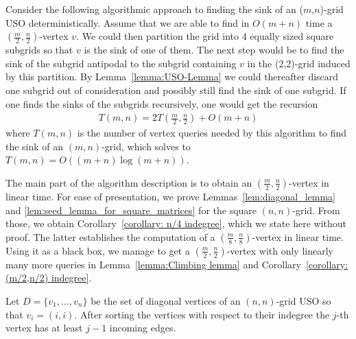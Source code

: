 \documentclass[runningheads,a4paper]{llncs}
\begin{document}
Consider the following algorithmic approach to finding the sink of an ($m$,$n$)-grid USO deterministically. 
Assume that we are able to find in $O(m+n)$ time a $(\frac{m}{2}, \frac{n}{2})$-vertex $v$.
We could then partition the grid into 4 equally sized square subgrids so that $v$ is the sink of one of them.
The next step would be to find the sink of the subgrid antipodal to the subgrid containing $v$ in the (2,2)-grid induced by this partition. 
By Lemma~\ref{lemma:USO-Lemma} we could thereafter discard one subgrid out of consideration and possibly still find the sink of one subgrid.
If one finds the sinks of the subgrids recursively, one would get the recursion
\begin{align*}
 T(m,n) = 2T\left(\frac{m}{2},\frac{n}{2}\right) + O(m+n)
\end{align*}
where $T(m,n)$ is the number of vertex queries needed by this algorithm to find the sink of an $(m,n)$-grid, which solves to \mbox{$T(m,n) = O((m+n)\log (m+n))$}. 

The main part of the algorithm description is to obtain an $(\frac{m}{2}, \frac{n}{2})$-vertex in linear time.
For ease of presentation, we prove Lemmas~\ref{lem:diagonal_lemma} and \ref{lem:seed_lemma_for_square_matrices} for the square $(n, n)$-grid. From those, 
we obtain Corollary~\ref{corollary: n/4 indegree}, which we state here without proof.  The latter establishes the computation of a 
$(\frac{m}{8}, \frac{n}{8})$-vertex in linear time. Using it as a black box, we manage to get a $(\frac{m}{2}, \frac{n}{2})$-vertex with only linearly 
many more queries in Lemma~\ref{lemma:Climbing lemma} and Corollary~\ref{corollary: (m/2,n/2) indegree}.

\begin{lemma}
\label{lem:diagonal_lemma}
Let $D = \{v_1,\ldots,v_n\}$ be the set of diagonal vertices of an $(n,n)$-grid USO so that $v_i = (i,i)$. After sorting the vertices with respect to their indegree the $j$-th vertex has at least $j-1$ incoming edges.
\end{lemma}
\end{document}
